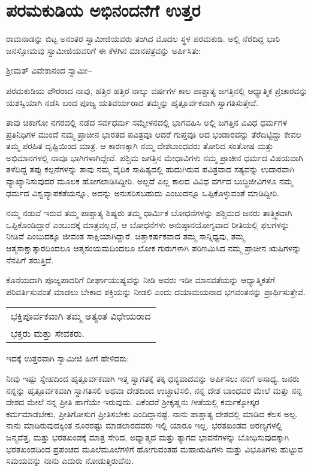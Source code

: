 
\chapter{ಪರಮಕುಡಿಯ ಅಭಿನಂದನೆಗೆ ಉತ್ತರ}

ರಾಮನಾಡನ್ನು ಬಿಟ್ಟ ಅನಂತರ ಸ್ವಾಮೀಜಿಯವರು ತಂಗಿದ ಮೊದಲ ಸ್ಥಳ ಪರಮಕುಡಿ. ಅಲ್ಲಿ ನೆರೆದಿದ್ದ ಭಾರಿ ಜನಸ್ತೋಮವು ಸ್ವಾಮೀಜಿಯವರಿಗೆ ಈ ಕೆಳಗಿನ ಮಾನಪತ್ರವನ್ನು ಅರ್ಪಿಸಿತು:

ಶ‍್ರೀಮತ್​ ವಿವೇಕಾನಂದ ಸ್ವಾಮೀ–

ಪರಮಕುಡಿಯ ಪೌರರಾದ ನಾವು, ಹತ್ತಿರ ಹತ್ತಿರ ನಾಲ್ಕು ವರ್ಷಗಳ ಕಾಲ ಪಾಶ್ಚಾತ್ಯ ಜಗತ್ತಿನಲ್ಲಿ ಆಧ್ಯಾತ್ಮಿಕ ಪ್ರಚಾರವನ್ನು ಯಶಸ್ವಿಯಾಗಿ ನಡೆಸಿ ಬಂದ ಪೂಜ್ಯ ಯತಿವರ್ಯರಾದ ತಮ್ಮನ್ನು ಹೃತ್ಪೂರ್ವಕವಾಗಿ ಸ್ವಾಗತಿಸುತ್ತೇವೆ. 

ತಾವು ಚಿಕಾಗೋ ನಗರದಲ್ಲಿ ನಡೆದ ಸರ್ವಧರ್ಮ ಸಮ್ಮೇಳನದಲ್ಲಿ ಭಾಗವಹಿಸಿ ಅಲ್ಲಿ ಜಗತ್ತಿನ ವಿವಿಧ ಧರ್ಮಗಳ ಪ್ರತಿನಿಧಿಗಳ ಮುಂದೆ ನಮ್ಮ ಪ್ರಾಚೀನ ಭಾರತದ ಪವಿತ್ರವೂ ಆದರೆ ಗುಪ್ತವೂ ಆದ ಭಂಡಾರವನ್ನು ತೆರೆದಿಟ್ಟಿದ್ದು ಕೇವಲ ತಮ್ಮ ಪರಹಿತ ದೃಷ್ಟಿಯಿಂದ ಮಾತ್ರ. ಆ ಕಾರಣಕ್ಕಾಗಿ ನಮ್ಮ ದೇಶಬಾಂಧವರು ತೋರಿದ ಸಂತೋಷ ಮತ್ತು ಅಭಿಮಾನಗಳಲ್ಲಿ ನಾವೂ ಭಾಗಿಗಳಾಗಿದ್ದೇವೆ. ಪಶ್ಚಿಮ ಜಗತ್ತಿನ ಮೇಧಾವಿಗಳು ನಮ್ಮ ಪ್ರಾಚೀನ ಧರ್ಮದ ವಿಷಯವಾಗಿ ತಳೆದಿದ್ದ ತಪ್ಪು ಕಲ್ಪನೆಗಳನ್ನು ತಾವು ನಮ್ಮ ವೈದಿಕ ಸಾಹಿತ್ಯದಲ್ಲಿ ಹುದುಗಿರುವ ಪವಿತ್ರವಾದ ಸತ್ಯವನ್ನು ಉದಾರವಾಗಿ ವ್ಯಾಖ್ಯಾನಿಸುವುದರ ಮೂಲಕ ಹೋಗಲಾಡಿಸಿದ್ದೀರಿ. ಅಲ್ಲದೆ ಎಲ್ಲ ಕಾಲದ ವಿವಿಧ ವರ್ಗದ ಬುದ್ಧಿಜೀವಿಗಳೂ ನಮ್ಮ ಧರ್ಮದ ವಿಶ್ವವ್ಯಾಪಕತೆಯನ್ನೂ, ಅದನ್ನು ಅನುಸರಿಸಬಹುದು ಎಂಬುದನ್ನೂ ಒಪ್ಪಿಕೊಳ್ಳುವಂತೆ ಮಾಡಿದ್ದೀರಿ. 

ನಮ್ಮ ನಡುವೆ ಇರುವ ತಮ್ಮ ಪಾಶ್ಚಾತ್ಯ ಶಿಷ್ಯರು ತಮ್ಮ ಧಾರ್ಮಿಕ ಬೋಧನೆಗಳನ್ನು ಪಶ್ಚಿಮದ ಜನರು ತಾತ್ತ್ವಿಕವಾಗಿ ಒಪ್ಪಿಕೊಂಡಿದ್ದಾರೆ ಎಂಬುದಕ್ಕೆ ಮಾತ್ರವಲ್ಲದೆ, ಆ ಬೋಧನೆಗಳು ಅನುಷ್ಠಾನಯೋಗ್ಯವಾದ ರೀತಿಯಲ್ಲಿ ಫಲಗಳನ್ನು ನೀಡಿವೆ ಎಂಬುದಕ್ಕೂ ಜೀವಂತ ಸಾಕ್ಷಿಯಾಗಿದ್ದಾರೆ. ಚಿತ್ತಾಕರ್ಷಕವಾದ ತಮ್ಮ ಸಾನ್ನಿಧ್ಯವು, ತಮ್ಮ ಆತ್ಮಸಾಕ್ಷಾತ್ಕಾರದಿಂದಲೂ ಆತ್ಮಸಂಯಮದಿಂದಲೂ ಲೋಕ ಗುರುಗಳಾಗಿ ಪರಿಣಮಿಸಿದ ನಮ್ಮ ಪ್ರಾಚೀನ ಋಷಿಗಳನ್ನು ನೆನಪಿಗೆ ತರುತ್ತಿದೆ. 

ಕೊನೆಯದಾಗಿ ಪೂಜ್ಯಪಾದರಿಗೆ ದೀರ್ಘಾಯುಷ್ಯವನ್ನು ನೀಡಿ ಅವರು ಇಡೀ ಮಾನವತೆಯನ್ನು ಆಧ್ಯಾತ್ಮಿಕತೆಗೆ ಪರಿವರ್ತಿಸುವಂತೆ ಮಾಡಲು ಬೇಕಾದ ಶಕ್ತಿಯನ್ನು ನೀಡಲಿ ಎಂದು ದಯಾಮಯನಾದ ಭಗವಂತನನ್ನು ಪ್ರಾರ್ಥಿಸುತ್ತೇವೆ.

\begin{longtable}[r]{@{}l@{}}
ಭಕ್ತಿಪೂರ್ವಕವಾಗಿ ತಮ್ಮ ಅತ್ಯಂತ ವಿಧೇಯರಾದ \\
ಭಕ್ತರು ಮತ್ತು ಸೇವಕರು. \\
\end{longtable}

ಇದಕ್ಕೆ ಉತ್ತರವಾಗಿ ಸ್ವಾಮೀಜಿ ಹೀಗೆ ಹೇಳಿದರು:

ನೀವು ಇಷ್ಟು ಸ್ನೇಹದಿಂದ ಹೃತ್ಪೂರ್ವಕವಾಗಿ ಇತ್ತ ಸ್ವಾಗತಕ್ಕೆ ತಕ್ಕ ಧನ್ಯವಾದವನ್ನು ಅರ್ಪಿಸಲು ನನಗೆ ಅಸಾಧ್ಯ. ಜನರು ನನ್ನನ್ನು ಹೃತ್ಪೂರ್ವಕವಾಗಿ ಸ್ವಾಗತಿಸಲಿ ಅಥವಾ ದೇಶದಿಂದ ಉಚ್ಛಾಟಿಸಲಿ, ನನ್ನ ದೇಶ ಬಾಂಧವರ ಮೇಲೆ ಮತ್ತು ನನ್ನ ದೇಶದ ಮೇಲೆ ನನ್ನ ಪ್ರೀತಿ ಹಾಗೆಯೇ ಇರುವುದು. ಏಕೆಂದರೆ ಶ‍್ರೀಕೃಷ್ಣನು ಗೀತೆಯಲ್ಲಿ ಕರ್ಮಕ್ಕೋಸ್ಕರ ಕರ್ಮಮಾಡಬೇಕು, ಪ್ರೀತಿಗೋಸುಗ ಪ್ರೀತಿಸಬೇಕು ಎಂದಿದ್ದಾನಷ್ಟೆ. ನಾನು ಪಾಶ್ಚಾತ್ಯ ದೇಶದಲ್ಲಿ ಮಾಡಿದ ಕೆಲಸ ಅಲ್ಪ. ನಾನು ಮಾಡಿರುವುದಕ್ಕಿಂತ ನೂರರಷ್ಟು ಮಾಡಲಾರದವರು ಇಲ್ಲಿ ಯಾರೂ ಇಲ್ಲ. ಭರತಖಂಡದ ಅರಣ್ಯಗಳಲ್ಲಿ ಜನ್ಮವೆತ್ತ, ಮತ್ತು ಭರತಖಂಡಕ್ಕೆ ಮಾತ್ರ ಸೇರಿದ, ಅಧ್ಯಾತ್ಮದ ಮತ್ತು ತ್ಯಾಗದ ಭಾವನೆಗಳನ್ನು ಬೋಧಿಸುವುದಕ್ಕಾಗಿ ಭರತಖಂಡದಿಂದ ಪ್ರಪಂಚದ ಮೂಲೆಮೂಲೆಗಳಿಗೆ ಹೋಗುವಂತಹ ಮಹಾಋಷಿಗಳು ಮತ್ತು ವಿಭೂತಿಗಳು ಹುಟ್ಟುವ ಸಮಯವನ್ನು ನಾನು ಎದುರು ನೋಡುತ್ತಿರುವೆನು. 

